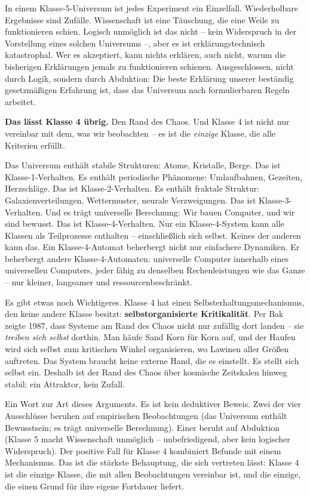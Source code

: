 \documentclass[11pt, twoside, openright]{book}
\begin{document}
In einem Klasse-5-Universum ist jedes Experiment ein Einzelfall. Wiederholbare Ergebnisse sind Zufälle. Wissenschaft ist eine Täuschung, die eine Weile zu funktionieren schien. Logisch unmöglich ist das nicht -- kein Widerspruch in der Vorstellung eines solchen Universums --, aber es ist erklärungstechnisch katastrophal. Wer es akzeptiert, kann nichts erklären, auch nicht, warum die bisherigen Erklärungen jemals zu funktionieren schienen. Ausgeschlossen, nicht durch Logik, sondern durch Abduktion: Die beste Erklärung unserer beständig gesetzmäßigen Erfahrung ist, dass das Universum nach formulierbaren Regeln arbeitet.

\textbf{Das lässt Klasse 4 übrig.} Den Rand des Chaos. Und Klasse 4 ist nicht nur vereinbar mit dem, was wir beobachten -- es ist die \textit{einzige} Klasse, die alle Kriterien erfüllt.

Das Universum enthält stabile Strukturen: Atome, Kristalle, Berge. Das ist Klasse-1-Verhalten. Es enthält periodische Phänomene: Umlaufbahnen, Gezeiten, Herzschläge. Das ist Klasse-2-Verhalten. Es enthält fraktale Struktur: Galaxienverteilungen, Wettermuster, neurale Verzweigungen. Das ist Klasse-3-Verhalten. Und es trägt universelle Berechnung: Wir bauen Computer, und wir sind bewusst. Das ist Klasse-4-Verhalten. Nur ein Klasse-4-System kann alle Klassen als Teilprozesse enthalten -- einschließlich sich selbst. Keines der anderen kann das. Ein Klasse-4-Automat beherbergt nicht nur einfachere Dynamiken. Er beherbergt andere Klasse-4-Automaten: universelle Computer innerhalb eines universellen Computers, jeder fähig zu denselben Rechenleistungen wie das Ganze -- nur kleiner, langsamer und ressourcenbeschränkt.

Es gibt etwas noch Wichtigeres. Klasse 4 hat einen Selbsterhaltungsmechanismus, den keine andere Klasse besitzt: \textbf{selbstorganisierte Kritikalität}. Per Bak zeigte 1987, dass Systeme am Rand des Chaos nicht nur zufällig dort landen -- sie \textit{treiben sich selbst} dorthin. Man häufe Sand Korn für Korn auf, und der Haufen wird sich selbst zum kritischen Winkel organisieren, wo Lawinen aller Größen auftreten. Das System braucht keine externe Hand, die es einstellt. Es stellt sich selbst ein. Deshalb ist der Rand des Chaos über kosmische Zeitskalen hinweg stabil: ein Attraktor, kein Zufall.

Ein Wort zur Art dieses Arguments. Es ist kein deduktiver Beweis. Zwei der vier Ausschlüsse beruhen auf empirischen Beobachtungen (das Universum enthält Bewusstsein; es trägt universelle Berechnung). Einer beruht auf Abduktion (Klasse 5 macht Wissenschaft unmöglich -- unbefriedigend, aber kein logischer Widerspruch). Der positive Fall für Klasse 4 kombiniert Befunde mit einem Mechanismus. Das ist die stärkste Behauptung, die sich vertreten lässt: Klasse 4 ist die einzige Klasse, die mit allen Beobachtungen vereinbar ist, und die einzige, die einen Grund für ihre eigene Fortdauer liefert.
\end{document}

